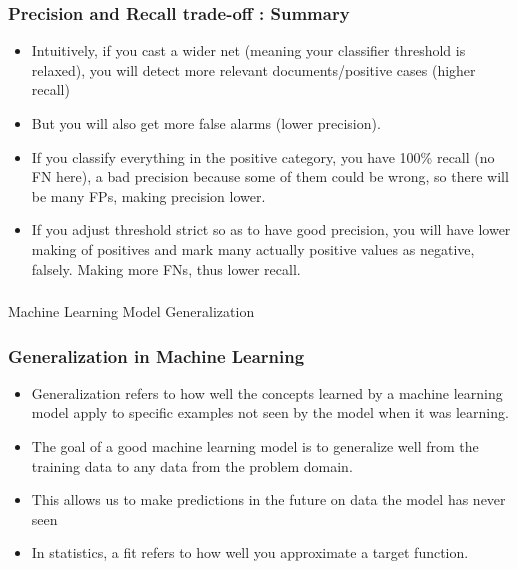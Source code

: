 

\begin{frame}[fragile]\frametitle{Precision and Recall trade-off : Summary}
\begin{itemize}
\item Intuitively, if you cast a wider net (meaning your classifier threshold is relaxed), you will detect more relevant documents/positive cases (higher recall) 
\item But you will also get more false alarms (lower precision). 
\item If you classify everything in the positive category, you have 100\% recall (no FN here), a bad precision because some of them could be wrong, so there will be many FPs, making precision lower.
\item If you adjust threshold strict so as to have good precision, you will have lower making of positives and mark many actually positive values as negative, falsely. Making more FNs, thus lower recall.
\end{itemize}
\end{frame}



\begin{frame}[fragile]\frametitle{}
\begin{center}
{\Large Machine Learning Model Generalization}
\end{center}
\end{frame}


\begin{frame}[fragile]\frametitle{Generalization in Machine Learning}
\begin{itemize}
\item Generalization refers to how well the concepts learned by a machine learning model apply to specific examples not seen by the model when it was learning.
\item The goal of a good machine learning model is to generalize well from the training data to any data from the problem domain. 
\item This allows us to make predictions in the future on data the model has never seen
\item In statistics, a fit refers to how well you approximate a target function.
\end{itemize}
\end{frame}


